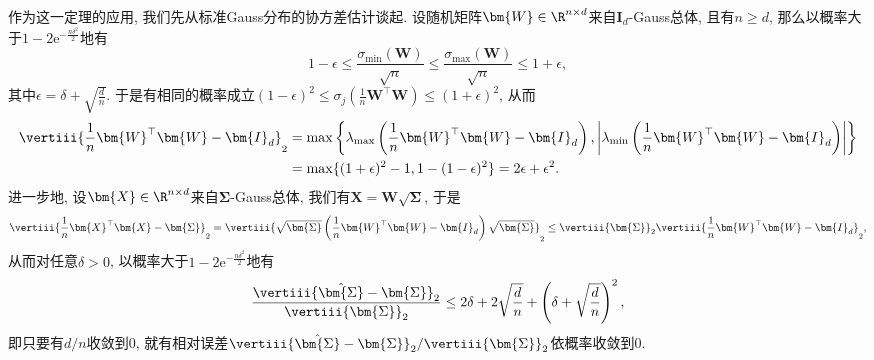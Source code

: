 作为这一定理的应用, 我们先从标准Gauss分布的协方差估计谈起. 
设随机矩阵$\bm{W} \in \R^{n \times d}$来自$\bm{I}_d$-Gauss总体, 且有$n \geq d$, 那么以概率大于$1 - 2 \mathrm{e}^{-\frac{n \delta^2}{2}}$地有
\begin{equation*}
	1 - \epsilon 
	\leq \frac{\sigma_{\min}(\bm{W})}{\sqrt{n}} 
	\leq \frac{\sigma_{\max}(\bm{W})}{\sqrt{n}}
	\leq 1 + \epsilon,  
\end{equation*}
其中$\epsilon = \delta + \sqrt{\frac{d}{n}}$. 
于是有相同的概率成立$(1-\epsilon)^2 \leq \sigma_j \left( \frac{1}{n} \bm{W}^\top \bm{W} \right) \leq (1+\epsilon)^2$, 从而
\begin{align*}
	\vertiii{\frac{1}{n} \bm{W}^\top \bm{W} - \bm{I}_d}_2
	&= \max\left\{ \lambda_{\max} \left(\frac{1}{n} \bm{W}^\top \bm{W} - \bm{I}_d\right), \left|\lambda_{\min} \left(\frac{1}{n} \bm{W}^\top \bm{W} - \bm{I}_d\right)\right| \right\} \\
	&= \max\{(1+\epsilon)^2 - 1, 1 - (1-\epsilon)^2\}
	= 2 \epsilon + \epsilon^2. 
\end{align*}
进一步地, 设$\bm{X} \in \R^{n \times d}$来自$\bm{\Sigma}$-Gauss总体, 我们有$\bm{X} = \bm{W} \sqrt{\bm{\Sigma}}$, 于是
\begin{align*}
	\vertiii{\frac{1}{n} \bm{X}^\top \bm{X} - \bm{\Sigma}}_2
	= \vertiii{\sqrt{\bm{\Sigma}} \left(\frac{1}{n} \bm{W}^\top \bm{W} - \bm{I}_d\right) \sqrt{\bm{\Sigma}}}_2
	\leq \vertiii{\bm{\Sigma}}_2 \vertiii{\frac{1}{n} \bm{W}^\top \bm{W} - \bm{I}_d}_2,  
\end{align*}
从而对任意$\delta > 0$, 以概率大于$1 - 2 \mathrm{e}^{-\frac{n \delta^2}{2}}$地有
\begin{equation*}
	\frac{\vertiii{\hat{\bm{\Sigma}} - \bm{\Sigma}}_2}{\vertiii{\bm{\Sigma}}_2}
	\leq 2 \delta + 2 \sqrt{\frac{d}{n}} + \left(\delta + \sqrt{\frac{d}{n}}\right)^2, 
\end{equation*}
即只要有$d/n$收敛到$0$, 就有相对误差$\vertiii{\hat{\bm{\Sigma}} - \bm{\Sigma}}_2 / \vertiii{\bm{\Sigma}}_2$依概率收敛到$0$. 


